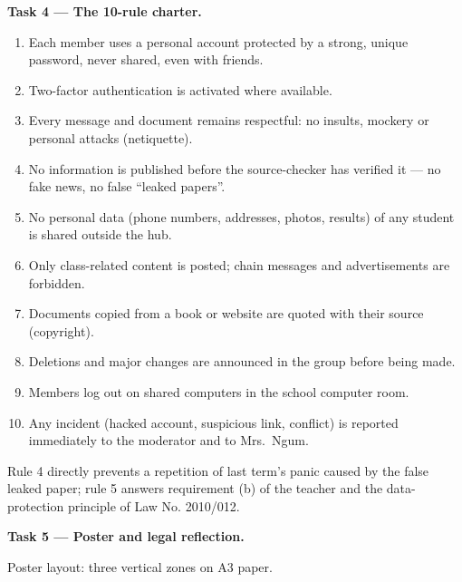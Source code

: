 \documentclass[11pt]{article}
\begin{document}
\textbf{Task 4 — The 10-rule charter.}
\begin{enumerate}
\item Each member uses a personal account protected by a strong, unique password, never shared, even with friends.
\item Two-factor authentication is activated where available.
\item Every message and document remains respectful: no insults, mockery or personal attacks (netiquette).
\item No information is published before the source-checker has verified it — no fake news, no false ``leaked papers''.
\item No personal data (phone numbers, addresses, photos, results) of any student is shared outside the hub.
\item Only class-related content is posted; chain messages and advertisements are forbidden.
\item Documents copied from a book or website are quoted with their source (copyright).
\item Deletions and major changes are announced in the group before being made.
\item Members log out on shared computers in the school computer room.
\item Any incident (hacked account, suspicious link, conflict) is reported immediately to the moderator and to Mrs.\ Ngum.
\end{enumerate}
Rule 4 directly prevents a repetition of last term's panic caused by the false leaked paper; rule 5 answers requirement (b) of the teacher and the data-protection principle of Law No. 2010/012.

\textbf{Task 5 — Poster and legal reflection.}\par
Poster layout: three vertical zones on A3 paper.
\end{document}
